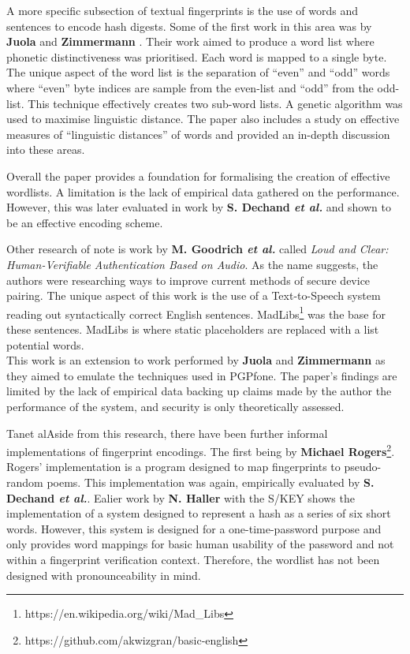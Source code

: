 A more specific subsection of textual fingerprints is the use of words and sentences to encode hash digests. Some of the first work in this area was by \textbf{Juola} and \textbf{Zimmermann} \cite{juola1996whole}. Their work aimed to produce a word list where phonetic distinctiveness was prioritised. Each word is mapped to a single byte. The unique aspect of the word list is the separation of ``even'' and ``odd'' words where ``even'' byte indices are sample from the even-list and ``odd'' from the odd-list. This technique effectively creates two sub-word lists.  A genetic algorithm was used to maximise linguistic distance. The paper also includes a study on effective measures of ``linguistic distances'' of words and provided an in-depth discussion into these areas.

Overall the paper provides a foundation for formalising the creation of effective wordlists. A limitation is the lack of empirical data gathered on the performance. However, this was later evaluated in work by \textbf{S. Dechand \textit{et al.}}\cite{dechand2016empirical} and shown to be an effective encoding scheme.

Other research of note is work by \textbf{M. Goodrich \textit{et al.}}\cite{goodrich2006loud} called \textit{Loud and Clear: Human-Verifiable Authentication Based on Audio}. As the name suggests, the authors were researching ways to improve current methods of secure device pairing. The unique aspect of this work is the use of a Text-to-Speech system reading out syntactically correct English sentences. MadLibs\footnote{https://en.wikipedia.org/wiki/Mad\_Libs} was the base for these sentences. MadLibs is where static placeholders are replaced with a list potential words.\\
This work is an extension to work performed by \textbf{Juola} and \textbf{Zimmermann}\cite{juola1996whole} as they aimed to emulate the techniques used in PGPfone. The paper's findings are limited by the lack of empirical data backing up claims made by the author the performance of the system, and security is only theoretically assessed.

Tanet alAside from this research, there have been further informal implementations of fingerprint encodings. The first being by \textbf{Michael Rogers}\footnote{https://github.com/akwizgran/basic-english}. Rogers' implementation is a program designed to map fingerprints to pseudo-random poems. This implementation was again, empirically evaluated by \textbf{S. Dechand \textit{et al.}}\cite{dechand2016empirical}. Ealier work by \textbf{N. Haller} with the S/KEY\cite{haller1995s} shows the implementation of a system designed to represent a hash as a series of six short words. However, this system is designed for a one-time-password purpose and only provides word mappings for basic human usability of the password and not within a fingerprint verification context. Therefore, the wordlist has not been designed with pronounceability in mind.

